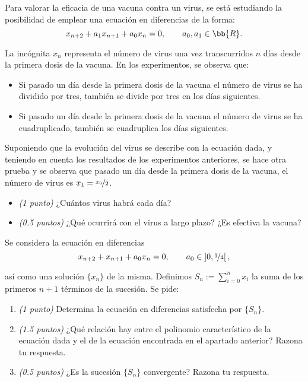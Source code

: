 \documentclass[12pt]{article}
\begin{document}
    \begin{ejercicio}
        Para valorar la eficacia de una vacuna contra un virus, se está
        estudiando la posibilidad de emplear una ecuación en diferencias de la forma:
        \begin{equation*}
            x_{n+2} + a_1x_{n+1} + a_0x_n = 0,\qquad a_0,a_1\in \bb{R}.
        \end{equation*}

        La incógnita $x_n$ representa el número de virus una vez transcurridos $n$ días
        desde la primera dosis de la vacuna. En los experimentos, se observa que:
        \begin{itemize}
            \item Si pasado un día desde la primera dosis de la vacuna el número de virus se ha dividido por tres,
            también se divide por tres en los días siguientes.
            \item Si pasado un día desde la primera dosis de la vacuna el número de virus se ha cuadruplicado,
            también se cuadruplica los días siguientes.
        \end{itemize}

        Suponiendo que la evolución del virus se describe con la ecuación dada, y teniendo en cuenta los resultados de los experimentos anteriores,
        se hace otra prueba y se observa que pasado un día desde la primera dosis de la vacuna, el número de virus es $x_1=\nicefrac{x_0}{2}$.
        \begin{itemize}
            \item \emph{(1 punto)} ¿Cuántos virus habrá cada día?
            \item \emph{(0.5 puntos)} ¿Qué ocurrirá con el virus a largo plazo? ¿Es efectiva la vacuna?
        \end{itemize}
    \end{ejercicio}



    \begin{ejercicio}
        Se considera la ecuación en diferencias
        \begin{equation*}
            x_{n+2} + x_{n+1} + a_0x_n = 0,\qquad a_0\in \left]0, \nicefrac{1}{4}\right[,
        \end{equation*}

        así como una solución $\{x_n\}$ de la misma. Definimos $S_n:=\sum\limits_{i=0}^n x_i$ la
        suma de los primeros $n+1$ términos de la sucesión. Se pide:
        \begin{enumerate}
            \item \emph{(1 punto)} Determina la ecuación en diferencias satisfecha por $\{S_n\}$.
            \item \emph{(1.5 puntos)} ¿Qué relación hay entre el polinomio característico de la ecuación dada y el de la ecuación encontrada en el apartado anterior?
            Razona tu respuesta.
            \item \emph{(0.5 puntos)} ¿Es la sucesión $\{S_n\}$ convergente? Razona tu respuesta.
        \end{enumerate}
    \end{ejercicio}
\end{document}
